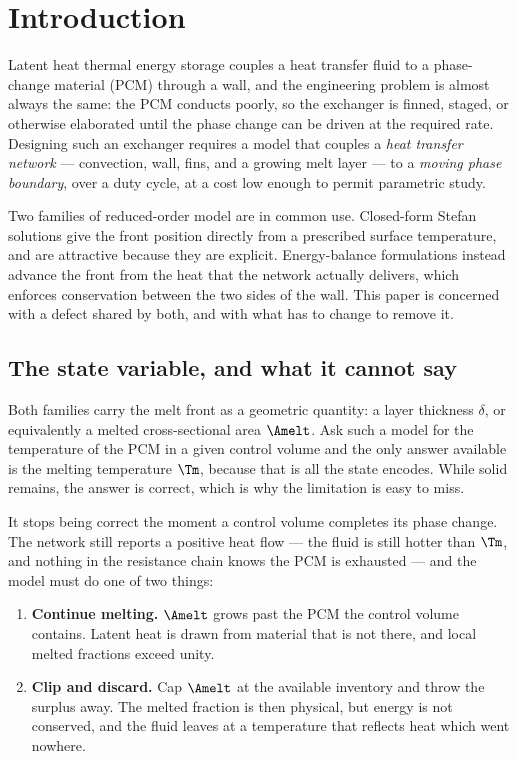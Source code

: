 \section{Introduction}
\label{sec:intro}

Latent heat thermal energy storage couples a heat transfer fluid to a
phase-change material (PCM) through a wall, and the engineering problem is
almost always the same: the PCM conducts poorly, so the exchanger is finned,
staged, or otherwise elaborated until the phase change can be driven at the
required rate. Designing such an exchanger requires a model that couples a
\emph{heat transfer network} --- convection, wall, fins, and a growing melt
layer --- to a \emph{moving phase boundary}, over a duty cycle, at a cost low
enough to permit parametric study.

Two families of reduced-order model are in common use. Closed-form Stefan
solutions give the front position directly from a prescribed surface
temperature, and are attractive because they are explicit. Energy-balance
formulations instead advance the front from the heat that the network actually
delivers, which enforces conservation between the two sides of the wall. This
paper is concerned with a defect shared by both, and with what has to change to
remove it.

\subsection{The state variable, and what it cannot say}

Both families carry the melt front as a geometric quantity: a layer thickness
$\delta$, or equivalently a melted cross-sectional area $\Amelt$. Ask such a
model for the temperature of the PCM in a given control volume and the only
answer available is the melting temperature $\Tm$, because that is all the state
encodes. While solid remains, the answer is correct, which is why the limitation
is easy to miss.

It stops being correct the moment a control volume completes its phase change.
The network still reports a positive heat flow --- the fluid is still hotter
than $\Tm$, and nothing in the resistance chain knows the PCM is exhausted ---
and the model must do one of two things:

\begin{enumerate}[leftmargin=1.8em,itemsep=2pt]
\item \textbf{Continue melting.} $\Amelt$ grows past the PCM the control volume
  contains. Latent heat is drawn from material that is not there, and local
  melted fractions exceed unity.
\item \textbf{Clip and discard.} Cap $\Amelt$ at the available inventory and
  throw the surplus away. The melted fraction is then physical, but energy is
  not conserved, and the fluid leaves at a temperature that reflects heat which
  went nowhere.
\end{enumerate}

